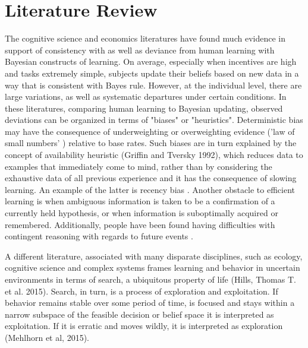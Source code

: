 \section{Literature Review}
The cognitive science and economics literatures have found much evidence in support of consistency with as well as deviance from human learning with Bayesian constructs of learning. On average, especially when incentives are high and tasks extremely simple, subjects update their beliefs based on new data in a way that is consistent with Bayes rule. However, at the individual level, there are large variations, as well as systematic departures under certain conditions.  In these literatures, comparing human learning to Bayesian updating, observed deviations can be organized in terms of "biases" or "heuristics".  Deterministic bias may have the consequence of underweighting or overweighting evidence ('law of small numbers' ) relative to base rates.  Such biases are in turn explained by the concept of availability heuristic (Griffin and Tversky 1992), which reduces data to examples that immediately come to mind, rather than by considering the exhaustive data of all previous experience and it has the consequence of slowing learning.  An example of the latter is recency bias \citep{FudenbergPeysakhovich2014}.  Another obstacle to efficient learning is when ambiguous information is taken to be a confirmation of a currently held hypothesis, or when information is suboptimally acquired or remembered.  Additionally, people have been found having difficulties with contingent reasoning with regards to future events \citep{CharnessLevin2009}. 
 
A different literature, associated with many disparate disciplines, such as ecology, cognitive science and complex systems frames learning and behavior in uncertain environments in terms of search, a ubiquitous property of life (Hills, Thomas T. et al. 2015).  Search, in turn, is a process of exploration and exploitation.  If behavior remains stable over some period of time, is focused and stays within a narrow subspace of the feasible decision or belief space it is interpreted as exploitation.  If it is erratic and moves wildly, it is interpreted as exploration (Mehlhorn et al, 2015).   


